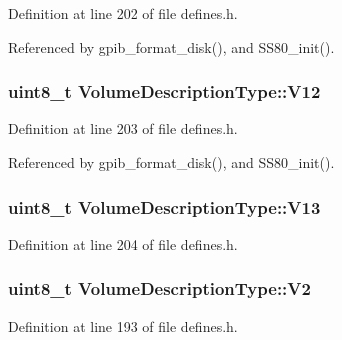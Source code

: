 Definition at line 202 of file defines.\+h.



Referenced by gpib\+\_\+format\+\_\+disk(), and S\+S80\+\_\+init().

\subsubsection[{\texorpdfstring{V12}{V12}}]{\setlength{\rightskip}{0pt plus 5cm}uint8\+\_\+t Volume\+Description\+Type\+::\+V12}\hypertarget{structVolumeDescriptionType_a96c6874117e4b64341e6c207bde061ae}{}\label{structVolumeDescriptionType_a96c6874117e4b64341e6c207bde061ae}


Definition at line 203 of file defines.\+h.



Referenced by gpib\+\_\+format\+\_\+disk(), and S\+S80\+\_\+init().

\subsubsection[{\texorpdfstring{V13}{V13}}]{\setlength{\rightskip}{0pt plus 5cm}uint8\+\_\+t Volume\+Description\+Type\+::\+V13}\hypertarget{structVolumeDescriptionType_ad3a75e21b674eadfa0db9d9df9672e16}{}\label{structVolumeDescriptionType_ad3a75e21b674eadfa0db9d9df9672e16}


Definition at line 204 of file defines.\+h.

\subsubsection[{\texorpdfstring{V2}{V2}}]{\setlength{\rightskip}{0pt plus 5cm}uint8\+\_\+t Volume\+Description\+Type\+::\+V2}\hypertarget{structVolumeDescriptionType_a0c89f2c3b579944fb549107411d97213}{}\label{structVolumeDescriptionType_a0c89f2c3b579944fb549107411d97213}


Definition at line 193 of file defines.\+h.

